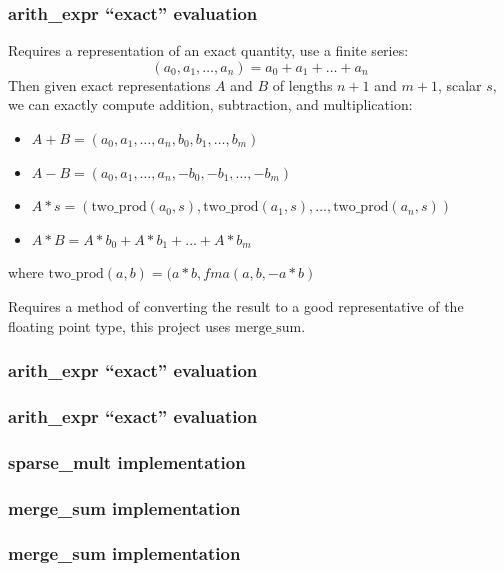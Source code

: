 \documentclass{beamer}
\begin{document}
\begin{frame}[fragile]
  \frametitle{arith\_expr ``exact'' evaluation}
  Requires a representation of an exact quantity, use a finite series: %
  $$(a_0, a_1, \ldots, a_n) = a_0 + a_1 + \ldots + a_n$$
  Then given exact representations $A$ and $B$ of lengths $n + 1$ and $m + 1$, scalar $s$, we can exactly compute addition, subtraction, and multiplication:
  \begin{itemize}
    \item $A + B = (a_0, a_1, \ldots, a_n, b_0, b_1, \ldots, b_m)$
    \item $A - B = (a_0, a_1, \ldots, a_n, -b_0, -b_1, \ldots, -b_m)$
    \item $A * s = (\text{two\_prod}(a_0, s), \text{two\_prod}(a_1, s), \ldots, \text{two\_prod}(a_n, s))$
    \item $A * B = A * b_0 + A * b_1 + \ldots + A * b_m$
  \end{itemize}
  where $\text{two\_prod}(a, b) = (a * b, fma(a, b, -a * b)$

  Requires a method of converting the result to a good representative of the floating point type, this project uses $\text{merge\_sum}$.
\end{frame}

\begin{frame}[fragile]
  \frametitle{arith\_expr ``exact'' evaluation}
  
\end{frame}

\begin{frame}[fragile]
  \frametitle{arith\_expr ``exact'' evaluation}
  
\end{frame}

\begin{frame}[fragile]
  \frametitle{sparse\_mult implementation}
  
\end{frame}

\begin{frame}[fragile]
  \frametitle{merge\_sum implementation}
  
\end{frame}

\begin{frame}[fragile]
  \frametitle{merge\_sum implementation}
  
\end{frame}
\end{document}
